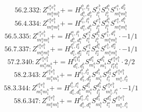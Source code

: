 \documentclass[letterpaper,10pt,fleqn,leqno,onecolumn]{article}
\begin{document}
\begin{equation} \;\;\;\;\;\;  56.2.332: Z^{e_{1}^{a}e_{1}^{b}}_{m_{1}^{a}m_{1}^{b}}+=H^{l_{1}^{b},l_{2}^{b}}_{d_{1}^{b},d_{2}^{b}}S^{e_{1}^{b}}_{l_{1}^{b}}S^{d_{1}^{b}}_{l_{2}^{b}}S^{e_{1}^{a},d_{2}^{b}}_{m_{1}^{a}m_{1}^{b}} \end{equation}
\begin{equation} \;\;\;\;\;\;  56.4.334: Z^{e_{1}^{a}e_{1}^{b}}_{m_{1}^{a}m_{1}^{b}}+=H^{l_{1}^{b},l_{1}^{a}}_{d_{1}^{a},d_{1}^{b}}S^{e_{1}^{b}}_{l_{1}^{b}}S^{d_{1}^{a}}_{l_{1}^{a}}S^{e_{1}^{a},d_{1}^{b}}_{m_{1}^{a}m_{1}^{b}} \end{equation}
\begin{equation} \;\;\;\;\;\;  56.5.335: Z^{e_{1}^{a}e_{1}^{b}}_{m_{1}^{a}m_{1}^{b}}+=H^{l_{1}^{a},l_{1}^{b}}_{d_{1}^{b},d_{1}^{a}}S^{e_{1}^{a}}_{l_{1}^{a}}S^{d_{1}^{b}}_{l_{1}^{b}}S^{e_{1}^{b},d_{1}^{a}}_{m_{1}^{a}m_{1}^{b}}\cdot -1/1 \end{equation}
\begin{equation} \;\;\;\;\;\;  56.7.337: Z^{e_{1}^{a}e_{1}^{b}}_{m_{1}^{a}m_{1}^{b}}+=H^{l_{1}^{a},l_{2}^{a}}_{d_{1}^{a},d_{2}^{a}}S^{e_{1}^{a}}_{l_{1}^{a}}S^{d_{1}^{a}}_{l_{2}^{a}}S^{e_{1}^{b},d_{2}^{a}}_{m_{1}^{a}m_{1}^{b}}\cdot -1/1 \end{equation}
\begin{equation} \;\;\;\;\;\;  57.2.340: Z^{e_{1}^{a}e_{1}^{b}}_{m_{1}^{a}m_{1}^{b}}+=H^{l_{1}^{a}l_{1}^{b}}_{d_{1}^{a},d_{1}^{b}}S^{d_{1}^{a}}_{m_{1}^{a}}S^{d_{1}^{b}}_{m_{1}^{b}}S^{e_{1}^{a}e_{1}^{b}}_{l_{1}^{a}l_{1}^{b}}\cdot 2/2 \end{equation}
\begin{equation} \;\;\;\;\;\;  58.2.343: Z^{e_{1}^{a}e_{1}^{b}}_{m_{1}^{a}m_{1}^{b}}+=H^{l_{1}^{b},l_{2}^{b}}_{d_{1}^{b},d_{2}^{b}}S^{d_{1}^{b}}_{m_{1}^{b}}S^{d_{2}^{b}}_{l_{1}^{b}}S^{e_{1}^{a}e_{1}^{b}}_{m_{1}^{a},l_{2}^{b}} \end{equation}
\begin{equation} \;\;\;\;\;\;  58.3.344: Z^{e_{1}^{a}e_{1}^{b}}_{m_{1}^{a}m_{1}^{b}}+=H^{l_{1}^{b},l_{1}^{a}}_{d_{1}^{a},d_{1}^{b}}S^{d_{1}^{a}}_{m_{1}^{a}}S^{d_{1}^{b}}_{l_{1}^{b}}S^{e_{1}^{a}e_{1}^{b}}_{m_{1}^{b},l_{1}^{a}}\cdot -1/1 \end{equation}
\begin{equation} \;\;\;\;\;\;  58.6.347: Z^{e_{1}^{a}e_{1}^{b}}_{m_{1}^{a}m_{1}^{b}}+=H^{l_{1}^{a},l_{1}^{b}}_{d_{1}^{b},d_{1}^{a}}S^{d_{1}^{b}}_{m_{1}^{b}}S^{d_{1}^{a}}_{l_{1}^{a}}S^{e_{1}^{a}e_{1}^{b}}_{m_{1}^{a},l_{1}^{b}} \end{equation}
\end{document}
